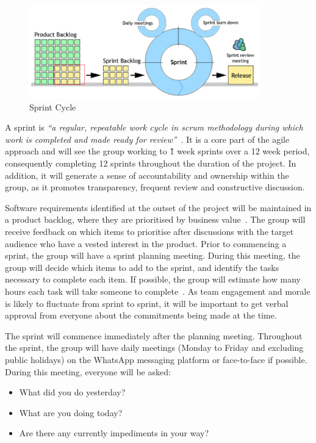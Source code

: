 \begin{figure}
  \centering
  \begin{minipage}{10cm}
    \centering
    \includegraphics[width=10cm]{inc/sprint_cycle.jpg}
    \caption{Sprint Cycle}
    \label{fig:spint_cycle}
  \end{minipage}
\end{figure}

A sprint is \emph{``a regular, repeatable work cycle in scrum methodology during which work is completed and made ready for review''}~\parencite{web:scrum_sprint}. It is a core part of the agile approach and will see the group working to \~1 week sprints over a 12 week period, consequently completing 12 sprints throughout the duration of the project. In addition, it will generate a sense of accountability and ownership within the group, as it promotes transparency, frequent review and constructive discussion.

Software requirements identified at the outset of the project will be maintained in a product backlog, where they are prioritised by business value~\parencite{book:agile_excellence}. The group will receive feedback on which items to prioritise after discussions with the target audience who have a vested interest in the product. Prior to commencing a sprint, the group will have a sprint planning meeting. During this meeting, the group will decide which items to add to the sprint, and identify the tasks necessary to complete each item. If possible, the group will estimate how many hours each task will take someone to complete~\parencite{web:scrum_sprint}. As team engagement and morale is likely to fluctuate from sprint to sprint, it will be important to get verbal approval from everyone about the commitments being made at the time.

The sprint will commence immediately after the planning meeting. Throughout the sprint, the group will have daily meetings (Monday to Friday and excluding public holidays) on the WhatsApp messaging platform or face-to-face if possible. During this meeting, everyone will be asked:

\begin{itemize}
  \item What did you do yesterday?
  \item What are you doing today?
  \item Are there any currently impediments in your way?
\end{itemize}

